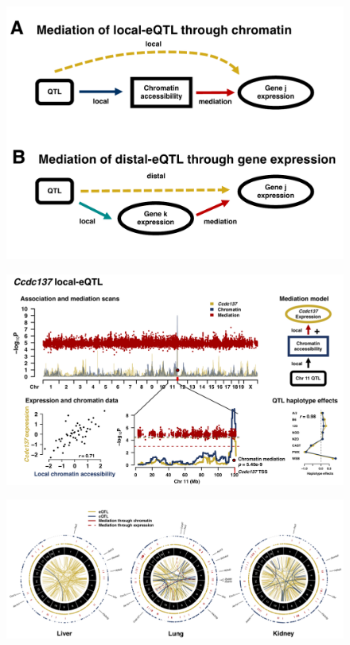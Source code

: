 \documentclass[10pt,letterpaper]{article}
\begin{document}
\begin{figure}[hp]
\includegraphics[width=\linewidth, clip, trim={0in 0.5in 0in 0in}]{figs/mediation_graph.pdf}
\caption{}
\end{figure}


\begin{figure}[hp]
\includegraphics[width=\textwidth, trim={0in 0in 0in 0in}, clip]{figs/ccdc137_mediation.png}
\caption{}
\end{figure}

\newpage

\begin{figure}[hp]
\includegraphics[width=\textwidth, trim={0in 0in 0in 0in}, clip]{figs/circos_over_tissues.png}
\caption{}
\end{figure}
\end{document}
